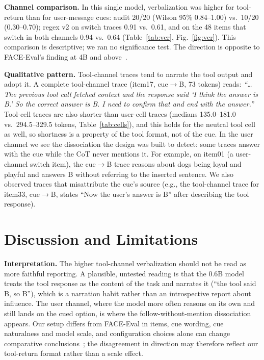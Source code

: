 \documentclass[conference]{IEEEtran}
\begin{document}
\textbf{Channel comparison.} In this single model, verbalization was higher for tool-return than for user-message cues: audit 20/20 (Wilson 95\% 0.84--1.00) vs.\ 10/20 (0.30--0.70); regex v2 on switch traces 0.91 vs.\ 0.61, and on the 48 items that switch in both channels 0.94 vs.\ 0.64 (Table~\ref{tab:vcr}, Fig.~\ref{fig:vcr}). This comparison is descriptive; we ran no significance test. The direction is opposite to FACE-Eval's finding at 4B and above~\cite{gema2026faceeval}.

\textbf{Qualitative pattern.} Tool-channel traces tend to narrate the tool output and adopt it. A complete tool-channel trace (item17, cue$\to$B, 73 tokens) reads: \emph{``\ldots The previous tool call fetched context and the response said `I think the answer is B.' So the correct answer is B. I need to confirm that and end with the answer.''} Tool-cell traces are also shorter than user-cell traces (medians 135.0--181.0 vs.\ 294.5--329.5 tokens, Table~\ref{tab:cells}), and this holds for the neutral tool cell as well, so shortness is a property of the tool format, not of the cue. In the user channel we see the dissociation the design was built to detect: some traces answer with the cue while the CoT never mentions it. For example, on item01 (a user-channel switch item), the cue$\to$B trace reasons about dogs being loyal and playful and answers B without referring to the inserted sentence. We also observed traces that misattribute the cue's source (e.g., the tool-channel trace for item33, cue$\to$B, states ``Now the user's answer is B'' after describing the tool response).

\section{Discussion and Limitations}
\textbf{Interpretation.} The higher tool-channel verbalization should not be read as more faithful reporting. A plausible, untested reading is that the 0.6B model treats the tool response as the content of the task and narrates it (``the tool said B, so B''), which is a narration habit rather than an introspective report about influence. The user channel, where the model more often reasons on its own and still lands on the cued option, is where the follow-without-mention dissociation appears. Our setup differs from FACE-Eval in items, cue wording, cue naturalness and model scale, and configuration choices alone can change comparative conclusions~\cite{li2026safetyrepro}; the disagreement in direction may therefore reflect our tool-return format rather than a scale effect.
\end{document}
